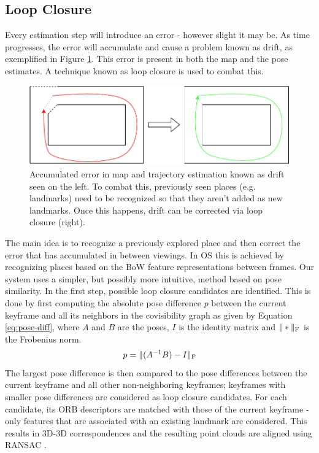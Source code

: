\documentclass[a4paper, 10pt]{article}
\begin{document}
\subsection{Loop Closure}
\label{sec:orgd746206}
Every estimation step will introduce an error - however slight it may be. As time progresses, the error will accumulate and cause a problem known as drift, as exemplified in Figure \ref{fig:org7f41ced}.
This error is present in both the map and the pose estimates. A technique known as loop closure is used to combat this.
\begin{figure}[htbp]
\centering
\includegraphics[width=0.5\linewidth]{./resources/drift.pdf}
\caption{\label{fig:org7f41ced}
Accumulated error in map and trajectory estimation known as drift seen on the left. To combat this, previously seen places (e.g. landmarks) need to be recognized so that they aren't added as new landmarks. Once this happens, drift can be corrected via loop closure (right).}
\end{figure}
The main idea is to recognize a previously explored place and then correct the error that has accumulated in between viewings. 
In OS this is achieved by recognizing places based on the BoW feature representations between frames. Our system uses a simpler, but possibly more intuitive, method based on pose similarity.
In the first step, possible loop closure candidates are identified. This is done by first computing the absolute pose difference \(p\) between the current keyframe and all its neighbors 
in the covisibility graph as given by Equation \ref{eq:pose-diff}, where \(A\) and \(B\) are the poses, \(I\) is the identity matrix and \(\|*\|_{\rm {F}}\) is the Frobenius norm. 
\begin{equation}
\label{eq:pose-diff}
p = \|(A^{-1} B) - I\|_{\rm {F}}
\end{equation}
The largest pose difference is then compared to the pose differences between the current keyframe and all other non-neighboring keyframes; 
keyframes with smaller pose differences are considered as loop closure candidates. For each candidate, its ORB descriptors are matched with those of the current keyframe - only features that are associated with an 
existing landmark are considered. This results in 3D-3D correspondences and the resulting point clouds are aligned using RANSAC \cite{ransac}.
\end{document}
